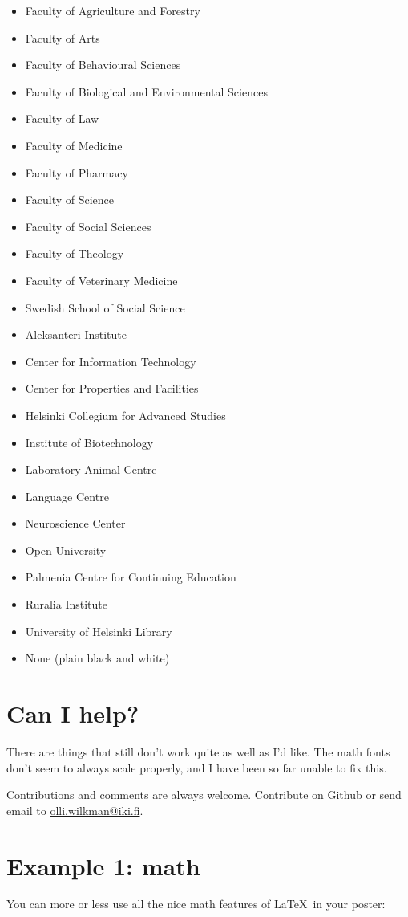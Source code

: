 \documentclass[final]{beamer}
\begin{document}
\begin{poster}
\begin{itemize}
\item Faculty of Agriculture and Forestry 
\item Faculty of Arts 
\item Faculty of Behavioural Sciences 
\item Faculty of Biological and Environmental Sciences 
\item Faculty of Law 
\item Faculty of Medicine 
\item Faculty of Pharmacy 
\item Faculty of Science 
\item Faculty of Social Sciences 
\item Faculty of Theology 
\item Faculty of Veterinary Medicine 
\item Swedish School of Social Science
\item Aleksanteri Institute
\item Center for Information Technology
\item Center for Properties and Facilities
\item Helsinki Collegium for Advanced Studies
\item Institute of Biotechnology
\item Laboratory Animal Centre
\item Language Centre
\item Neuroscience Center
\item Open University
\item Palmenia Centre for Continuing Education
\item Ruralia Institute
\item University of Helsinki Library
\item None (plain black and white)
\end{itemize}


\section{Can I help?}
There are things that still don't work quite as well as I'd like. The math fonts don't seem to always scale properly, and I have been so far unable to fix this.

Contributions and comments are always welcome. Contribute on Github or send email to \url{olli.wilkman@iki.fi}.


\newcolumn

\section{Example 1: math}
You can more or less use all the nice math features of \LaTeX~in your poster:


\end{poster}
\end{document}

